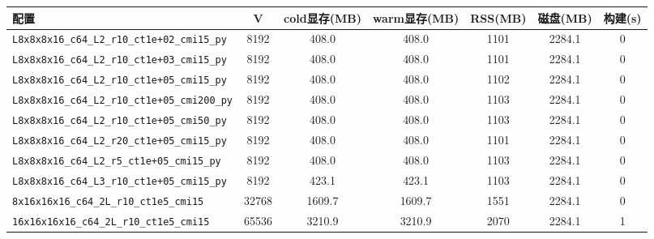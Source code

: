 \begin{tabular}{lcccccc}
\hline
配置 & V & cold显存(MB) & warm显存(MB) & RSS(MB) & 磁盘(MB) & 构建(s) \\
\hline
\texttt{L8x8x8x16\_c64\_L2\_r10\_ct1e+02\_cmi15\_py} & 8192 & 408.0 & 408.0 & 1101 & 2284.1 & 0 \\
\texttt{L8x8x8x16\_c64\_L2\_r10\_ct1e+03\_cmi15\_py} & 8192 & 408.0 & 408.0 & 1101 & 2284.1 & 0 \\
\texttt{L8x8x8x16\_c64\_L2\_r10\_ct1e+05\_cmi15\_py} & 8192 & 408.0 & 408.0 & 1102 & 2284.1 & 0 \\
\texttt{L8x8x8x16\_c64\_L2\_r10\_ct1e+05\_cmi200\_py} & 8192 & 408.0 & 408.0 & 1103 & 2284.1 & 0 \\
\texttt{L8x8x8x16\_c64\_L2\_r10\_ct1e+05\_cmi50\_py} & 8192 & 408.0 & 408.0 & 1103 & 2284.1 & 0 \\
\texttt{L8x8x8x16\_c64\_L2\_r20\_ct1e+05\_cmi15\_py} & 8192 & 408.0 & 408.0 & 1101 & 2284.1 & 0 \\
\texttt{L8x8x8x16\_c64\_L2\_r5\_ct1e+05\_cmi15\_py} & 8192 & 408.0 & 408.0 & 1103 & 2284.1 & 0 \\
\texttt{L8x8x8x16\_c64\_L3\_r10\_ct1e+05\_cmi15\_py} & 8192 & 423.1 & 423.1 & 1103 & 2284.1 & 0 \\
\texttt{8x16x16x16\_c64\_2L\_r10\_ct1e5\_cmi15} & 32768 & 1609.7 & 1609.7 & 1551 & 2284.1 & 0 \\
\texttt{16x16x16x16\_c64\_2L\_r10\_ct1e5\_cmi15} & 65536 & 3210.9 & 3210.9 & 2070 & 2284.1 & 1 \\
\hline
\end{tabular}
